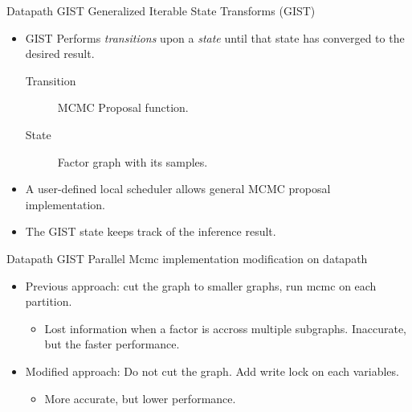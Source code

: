 \documentclass[onlymath,xcolor=pdftex,dvipsnames,table]{beamer}
\newcommand{\gist}{\textsc{GIST}\xspace}
\let\oldemph\emph
\renewcommand{\emph}[1]{{\color{Blue}\oldemph{#1}}}
\newcommand{\head}[1]{{\large\color{OliveGreen}#1\\[2pt]}}
\begin{document}
\begin{frame}{Datapath \gist}
\head{Generalized Iterable State Transforms (GIST)}
\begin{itemize}
  \item GIST Performs \emph{transitions} upon a \emph{state} until that state has converged to the desired result.
  \begin{description}
    \item[Transition] MCMC Proposal function.
    \item[State] Factor graph with its samples.
  \end{description}
  \item A user-defined local scheduler allows general MCMC proposal implementation.
  \item The GIST state keeps track of the inference result.
\end{itemize}
\end{frame}


\begin{frame}{Datapath \gist}
\head{Parallel Mcmc implementation modification on datapath}
\begin{itemize}
  \item Previous approach: cut the graph to smaller graphs, run mcmc on each partition. 
    \begin{itemize}
      \item Lost information when a factor is accross multiple subgraphs.  Inaccurate, but the faster performance.
    \end{itemize}
  \item Modified approach: Do not cut the graph. Add write lock on each variables.
    \begin{itemize}
      \item More accurate, but lower performance. 
    \end{itemize}
\end{itemize}
\end{frame}
\end{document}
